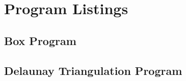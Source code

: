 \chapter{Program Listings}
\label{applistings}
\section{Box Program}



\clearpage

\section{Delaunay Triangulation Program}


